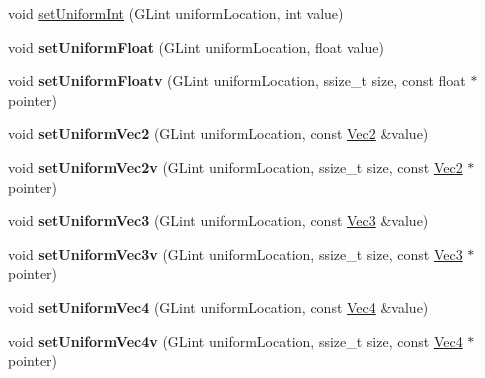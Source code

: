 \textbf{ }\par
\begin{DoxyCompactItemize}
\item 
void \hyperlink{classGLProgramState_adb5469ae785904fc233ddc37ea6af9c6}{set\+Uniform\+Int} (G\+Lint uniform\+Location, int value)
\item 
\mbox{\label{classGLProgramState_a38c355d0ad729a219e837b354a318ce1}} 
void {\bfseries set\+Uniform\+Float} (G\+Lint uniform\+Location, float value)
\item 
\mbox{\label{classGLProgramState_ad72ef3dbd94b03c2d715df5162acdd1c}} 
void {\bfseries set\+Uniform\+Floatv} (G\+Lint uniform\+Location, ssize\+\_\+t size, const float $\ast$pointer)
\item 
\mbox{\label{classGLProgramState_a07f0d7e29deaaf64b724ab260f792b65}} 
void {\bfseries set\+Uniform\+Vec2} (G\+Lint uniform\+Location, const \hyperlink{classVec2}{Vec2} \&value)
\item 
\mbox{\label{classGLProgramState_a1f34db843a26ad79d6135b301080e26d}} 
void {\bfseries set\+Uniform\+Vec2v} (G\+Lint uniform\+Location, ssize\+\_\+t size, const \hyperlink{classVec2}{Vec2} $\ast$pointer)
\item 
\mbox{\label{classGLProgramState_a2324e374fe47641447549da140b13796}} 
void {\bfseries set\+Uniform\+Vec3} (G\+Lint uniform\+Location, const \hyperlink{classVec3}{Vec3} \&value)
\item 
\mbox{\label{classGLProgramState_a14a86f49ed0f6d63d136adbe0e2e4cf6}} 
void {\bfseries set\+Uniform\+Vec3v} (G\+Lint uniform\+Location, ssize\+\_\+t size, const \hyperlink{classVec3}{Vec3} $\ast$pointer)
\item 
\mbox{\label{classGLProgramState_acf7014d1f503bba9d43ac64e5c6421d9}} 
void {\bfseries set\+Uniform\+Vec4} (G\+Lint uniform\+Location, const \hyperlink{classVec4}{Vec4} \&value)
\item 
\mbox{\label{classGLProgramState_aa56f2b3085979b94d64cd1e18d9d0052}} 
void {\bfseries set\+Uniform\+Vec4v} (G\+Lint uniform\+Location, ssize\+\_\+t size, const \hyperlink{classVec4}{Vec4} $\ast$pointer)

\end{DoxyCompactItemize}
